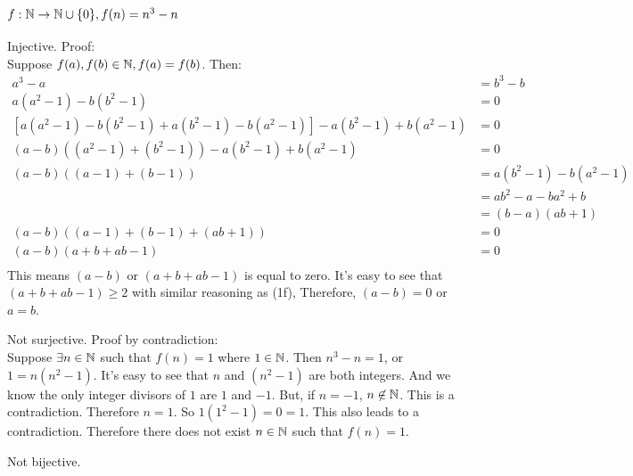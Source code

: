     \subsection{$f: \mathbb{N} \to \mathbb{N} \cup \{ 0 \}, f(n) = n^3 - n$}
        Injective. Proof: \\ 
            Suppose $f(a), f(b) \in \mathbb{N}, f(a) = f(b)$.
            Then:
            \begin{align*}
                a^3 - a &= b^3 - b \\ 
                a(a^2 - 1) - b(b^2 - 1) &= 0 \\ 
                [a(a^2 - 1) - b(b^2-1) + a(b^2-1) - b(a^2 - 1) ]
                    - a(b^2 - 1)
                    + b(a^2 - 1)
                    &= 0 \\
                (a - b)((a^2 - 1) + (b^2 - 1))
                    - a(b^2 - 1)
                    + b(a^2 - 1)
                    &= 0 \\ 
                (a - b)((a - 1) + (b - 1)) &= a(b^2 - 1) - b(a^2 - 1) \\ 
                    &= ab^2 - a - ba^2 +b \\ 
                    &= (b - a)(ab + 1) \\ 
                (a - b)((a - 1) + (b - 1) + (ab + 1)) &= 0 \\ 
                (a - b)(a + b + ab - 1) &= 0 \\ 
            \end{align*}
            This means $(a - b)$ or $(a + b + ab - 1)$ is equal to zero.
            It's easy to see that $(a + b + ab - 1) \geq 2$ with similar reasoning as (1f), 
            Therefore, $(a - b) = 0$ or $a = b$. 

        Not surjective. Proof by contradiction: \\ 
            Suppose $\exists n \in \mathbb{N}$ such that $f(n) = 1$ where $1 \in\mathbb{N}$.
            Then $n^3 - n = 1$, or $1 = n (n^2 - 1)$. 
            It's easy to see that $n$ and $(n^2 - 1)$ are both integers.
            And we know the only integer divisors of $1$ are $1$ and $-1$.
            But, if $n = -1$, $n \not \in \mathbb{N}$.
            This is a contradiction.
            Therefore $n = 1$.
            So $1 (1^2 - 1) = 0 = 1$.
            This also leads to a contradiction.
            Therefore there does not exist $n \in \mathbb{N}$ such that $f(n) = 1$.

        Not bijective.